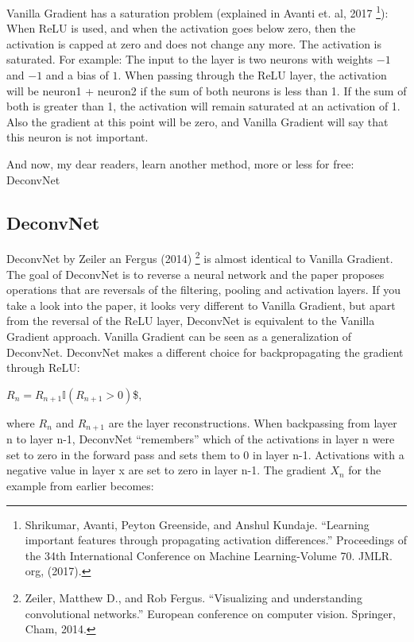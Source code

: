 \documentclass[
  12pt,
]{krantz}
\begin{document}
Vanilla Gradient has a saturation problem (explained in Avanti et. al, 2017 \footnote{Shrikumar, Avanti, Peyton Greenside, and Anshul Kundaje. ``Learning important features through propagating activation differences.'' Proceedings of the 34th International Conference on Machine Learning-Volume 70. JMLR. org, (2017).}):
When ReLU is used, and when the activation goes below zero, then the activation is capped at zero and does not change any more.
The activation is saturated.
For example: The input to the layer is two neurons with weights \(-1\) and \(-1\) and a bias of \(1\).
When passing through the ReLU layer, the activation will be neuron1 + neuron2 if the sum of both neurons is less than 1.
If the sum of both is greater than 1, the activation will remain saturated at an activation of 1.
Also the gradient at this point will be zero, and Vanilla Gradient will say that this neuron is not important.

And now, my dear readers, learn another method, more or less for free: DeconvNet

\hypertarget{deconvnet}{%
\subsection{DeconvNet}\label{deconvnet}}

DeconvNet by Zeiler an Fergus (2014) \footnote{Zeiler, Matthew D., and Rob Fergus. ``Visualizing and understanding convolutional networks.'' European conference on computer vision. Springer, Cham, 2014.} is almost identical to Vanilla Gradient.
The goal of DeconvNet is to reverse a neural network and the paper proposes operations that are reversals of the filtering, pooling and activation layers.
If you take a look into the paper, it looks very different to Vanilla Gradient, but apart from the reversal of the ReLU layer, DeconvNet is equivalent to the Vanilla Gradient approach.
Vanilla Gradient can be seen as a generalization of DeconvNet.
DeconvNet makes a different choice for backpropagating the gradient through ReLU:

\(R_n=R_{n+1}\mathbb{I}(R_{n+1}>0)\)\$,

where \(R_n\) and \(R_{n+1}\) are the layer reconstructions.
When backpassing from layer n to layer n-1, DeconvNet ``remembers'' which of the activations in layer n were set to zero in the forward pass and sets them to 0 in layer n-1.
Activations with a negative value in layer x are set to zero in layer n-1.
The gradient \(X_n\) for the example from earlier becomes:
\end{document}
